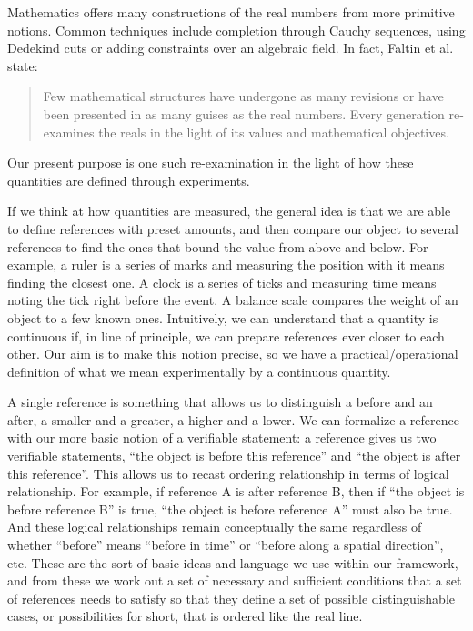 \documentclass[12pt]{iopart}
\begin{document}
Mathematics offers many constructions of the real numbers from more primitive notions. Common techniques include completion through Cauchy sequences, using Dedekind cuts or adding constraints over an algebraic field. In fact, Faltin et al. state\cite{faltin1975real}:
\begin{quote}
Few mathematical structures have undergone as many revisions or have been presented in as many guises as the real numbers. Every generation re-examines the reals in the light of its values and mathematical objectives.
\end{quote}
Our present purpose is one such re-examination in the light of how these quantities are defined through experiments.

If we think at how quantities are measured, the general idea is that we are able to define references with preset amounts, and then compare our object to several references to find the ones that bound the value from above and below. For example, a ruler is a series of marks and measuring the position with it means finding the closest one. A clock is a series of ticks and measuring time means noting the tick right before the event. A balance scale compares the weight of an object to a few known ones. Intuitively, we can understand that a quantity is continuous if, in line of principle, we can prepare references ever closer to each other. Our aim is to make this notion precise, so we have a practical/operational definition of what we mean experimentally by a continuous quantity.

A single reference is something that allows us to distinguish a before and an after, a smaller and a greater, a higher and a lower. We can formalize a reference with our more basic notion of a verifiable statement: a reference gives us two verifiable statements, ``the object is before this reference'' and ``the object is after this reference''. This allows us to recast ordering relationship in terms of logical relationship. For example, if reference A is after reference B, then if ``the object is before reference B'' is true, ``the object is before reference A'' must also be true. And these logical relationships remain conceptually the same regardless of whether ``before'' means ``before in time'' or ``before along a spatial direction'', etc. These are the sort of basic ideas and language we use within our framework, and from these we work out a set of necessary and sufficient conditions that a set of references needs to satisfy so that they define a set of possible distinguishable cases, or possibilities for short, that is ordered like the real line.
\end{document}
